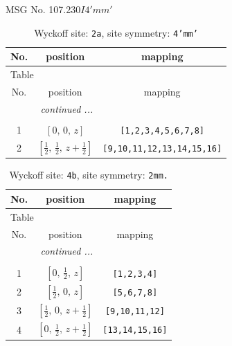 \documentclass[fleqn,8pt]{jsarticle}
\begin{document}
\setcounter{MaxMatrixCols}{32}

\renewcommand{\tablename}{Table~}
\renewcommand{\figurename}{Figure~}
\begin{center}
\LARGE
MSG No. 107.230\quad$I4'mm'$
\end{center}
\renewcommand{\arraystretch}{1.2}
\begin{longtable}{ccc}
\caption{Wyckoff site: {\tt 2a}, site symmetry: {\tt 4'mm'}}
 \\
 \hline \hline
No. & position & mapping \\ \hline \endfirsthead

\multicolumn{2}{l}{\tablename\ \thetable{}} \\
 \hline \hline
No. & position & mapping \\ \hline \endhead

 \hline \hline
\multicolumn{2}{r}{\footnotesize\it continued ...} \\ \endfoot

 \hline \hline
\multicolumn{2}{r}{} \\ \endlastfoot

1 & $\left[ 0,\, 0,\, z \right]$ & {\tt [1,2,3,4,5,6,7,8]} \\ \hline
2 & $\left[ \frac{1}{2},\, \frac{1}{2},\, z + \frac{1}{2} \right]$ & {\tt [9,10,11,12,13,14,15,16]} \\
\end{longtable}
\renewcommand{\arraystretch}{1.2}
\begin{longtable}{ccc}
\caption{Wyckoff site: {\tt 4b}, site symmetry: {\tt 2mm.}}
 \\
 \hline \hline
No. & position & mapping \\ \hline \endfirsthead

\multicolumn{2}{l}{\tablename\ \thetable{}} \\
 \hline \hline
No. & position & mapping \\ \hline \endhead

 \hline \hline
\multicolumn{2}{r}{\footnotesize\it continued ...} \\ \endfoot

 \hline \hline
\multicolumn{2}{r}{} \\ \endlastfoot

1 & $\left[ 0,\, \frac{1}{2},\, z \right]$ & {\tt [1,2,3,4]} \\ \hline
2 & $\left[ \frac{1}{2},\, 0,\, z \right]$ & {\tt [5,6,7,8]} \\ \hline
3 & $\left[ \frac{1}{2},\, 0,\, z + \frac{1}{2} \right]$ & {\tt [9,10,11,12]} \\ \hline
4 & $\left[ 0,\, \frac{1}{2},\, z + \frac{1}{2} \right]$ & {\tt [13,14,15,16]} \\
\end{longtable}
\end{document}
